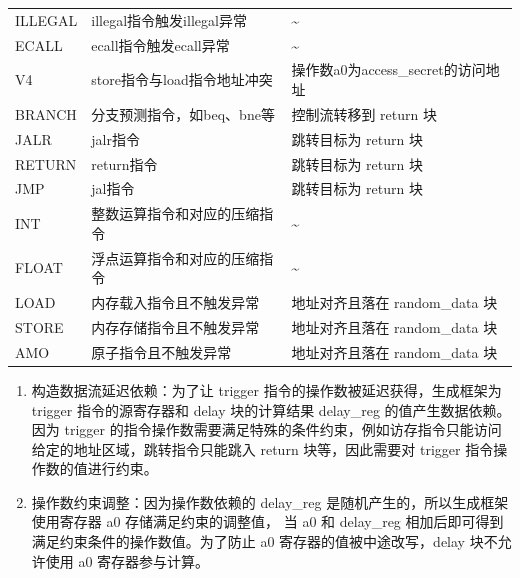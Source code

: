 \begin{table}[h!]
\begin{center}
{\begin{tabular}{|l|l|l|}
            ILLEGAL             &   illegal指令触发illegal异常                & \textasciitilde                                             \\
            ECALL               &   ecall指令触发ecall异常                    & \textasciitilde                                             \\
            V4                  &   store指令与load指令地址冲突                &  操作数a0为access\_secret的访问地址                      \\
            BRANCH              &   分支预测指令，如beq、bne等                 &  控制流转移到 return 块    \\
            JALR                &   jalr指令                                 &  跳转目标为 return 块                                        \\
            RETURN              &   return指令                               &  跳转目标为 return 块                                        \\
            JMP                 &   jal指令                                  &  跳转目标为 return 块                                        \\
            INT                 &   整数运算指令和对应的压缩指令      & \textasciitilde                                             \\
            FLOAT               &   浮点运算指令和对应的压缩指令    & \textasciitilde                                             \\
            LOAD                &   内存载入指令且不触发异常          & 地址对齐且落在 random\_data 块                 \\ 
            STORE               &   内存存储指令且不触发异常          & 地址对齐且落在 random\_data 块                    \\ 
            AMO                 &   原子指令且不触发异常                       & 地址对齐且落在 random\_data 块                    \\ 
            \hline
        \end{tabular}
    }
    \end{center}
\end{table}

\begin{enumerate}
    \item 构造数据流延迟依赖：为了让 trigger 指令的操作数被延迟获得，生成框架为 trigger 指令的源寄存器和 delay 块的计算结果 delay\_reg 的值产生数据依赖。
    因为 trigger 的指令操作数需要满足特殊的条件约束，例如访存指令只能访问给定的地址区域，跳转指令只能跳入 return 块等，因此需要对
    trigger 指令操作数的值进行约束。\par
    \item 操作数约束调整：因为操作数依赖的 delay\_reg 是随机产生的，所以生成框架使用寄存器 a0 存储满足约束的调整值，
    当 a0 和 delay\_reg 相加后即可得到满足约束条件的操作数值。为了防止 a0 寄存器的值被中途改写，delay 块不允许使用 a0 寄存器参与计算。\par
\end{enumerate}

